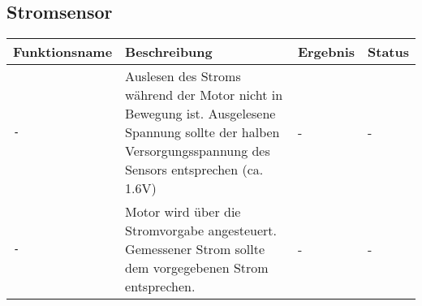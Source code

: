 \documentclass{article}
\begin{document}
	\subsection{Stromsensor}
		\begin{tabular}{|p{3.2cm}|p{5.5cm}|p{4cm}| p{1.6cm} |}
			\hline
				\textbf{Funktionsname} & \textbf{Beschreibung} & \textbf{Ergebnis} & \textbf{Status} \\
			\hline
				\texttt{-} & Auslesen des Stroms während der Motor nicht in Bewegung ist. Ausgelesene Spannung sollte der halben Versorgungsspannung des Sensors entsprechen (ca. 1.6V) & - & - \\
			\hline
				\texttt{-} & Motor wird über die Stromvorgabe angesteuert. Gemessener Strom sollte dem vorgegebenen Strom entsprechen. & - & - \\
			\hline
		\end{tabular} 
\end{document}

